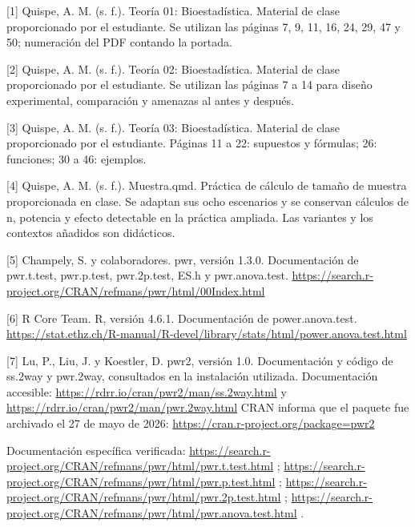 \documentclass[10pt,a4paper]{article}
\begin{document}
[1] Quispe, A. M. (s. f.). Teoría 01: Bioestadística. Material de clase proporcionado por el estudiante. Se utilizan las páginas 7, 9, 11, 16, 24, 29, 47 y 50; numeración del PDF contando la portada.

[2] Quispe, A. M. (s. f.). Teoría 02: Bioestadística. Material de clase proporcionado por el estudiante. Se utilizan las páginas 7 a 14 para diseño experimental, comparación y amenazas al antes y después.

[3] Quispe, A. M. (s. f.). Teoría 03: Bioestadística. Material de clase proporcionado por el estudiante. Páginas 11 a 22: supuestos y fórmulas; 26: funciones; 30 a 46: ejemplos.

[4] Quispe, A. M. (s. f.). Muestra.qmd. Práctica de cálculo de tamaño de muestra proporcionada en clase. Se adaptan sus ocho escenarios y se conservan cálculos de n, potencia y efecto detectable en la práctica ampliada. Las variantes y los contextos añadidos son didácticos.

[5] Champely, S. y colaboradores. pwr, versión 1.3.0. Documentación de pwr.t.test, pwr.p.test, pwr.2p.test, ES.h y pwr.anova.test. \url{https://search.r-project.org/CRAN/refmans/pwr/html/00Index.html}

[6] R Core Team. R, versión 4.6.1. Documentación de power.anova.test. \url{https://stat.ethz.ch/R-manual/R-devel/library/stats/html/power.anova.test.html}

[7] Lu, P., Liu, J. y Koestler, D. pwr2, versión 1.0. Documentación y código de ss.2way y pwr.2way, consultados en la instalación utilizada. Documentación accesible: \url{https://rdrr.io/cran/pwr2/man/ss.2way.html} y \url{https://rdrr.io/cran/pwr2/man/pwr.2way.html} CRAN informa que el paquete fue archivado el 27 de mayo de 2026: \url{https://cran.r-project.org/package=pwr2}

Documentación específica verificada: \url{https://search.r-project.org/CRAN/refmans/pwr/html/pwr.t.test.html} ; \url{https://search.r-project.org/CRAN/refmans/pwr/html/pwr.p.test.html} ; \url{https://search.r-project.org/CRAN/refmans/pwr/html/pwr.2p.test.html} ; \url{https://search.r-project.org/CRAN/refmans/pwr/html/pwr.anova.test.html} .
\end{document}
